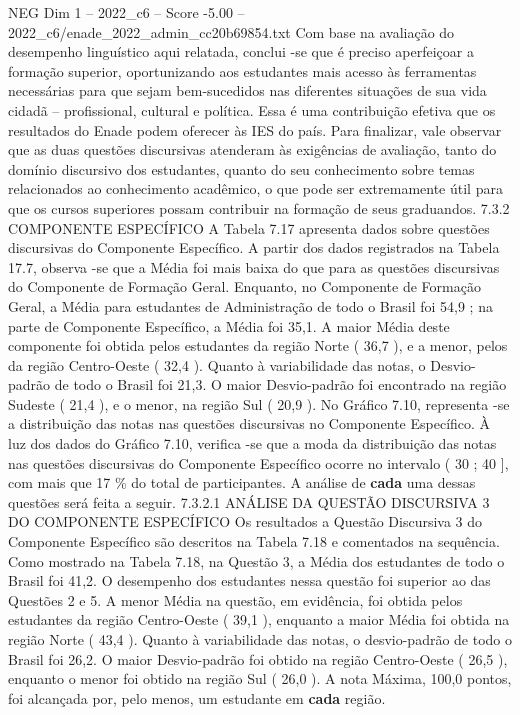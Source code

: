 \begin{textsample}{NEG Dim 1 – 2022\_c6 – Score -5.00 – 2022\_c6/enade\_2022\_admin\_cc20b69854.txt}
Com base na avaliação do desempenho linguístico aqui relatada, conclui -se que é preciso aperfeiçoar a formação superior, oportunizando aos estudantes mais acesso às ferramentas necessárias para que sejam bem-sucedidos nas diferentes situações de sua vida cidadã – profissional, cultural e política.
Essa é uma contribuição efetiva que os resultados do Enade podem oferecer às IES do país.
Para finalizar, vale observar que as duas questões discursivas atenderam às exigências de avaliação, tanto do domínio discursivo dos estudantes, quanto do seu conhecimento sobre temas relacionados ao conhecimento acadêmico, o que pode ser extremamente útil para que os cursos superiores possam contribuir na formação de seus graduandos. 7.3.2 COMPONENTE ESPECÍFICO A Tabela 7.17 apresenta dados sobre questões discursivas do Componente Específico.
A partir dos dados registrados na Tabela 17.7, observa -se que a Média foi mais baixa do que para as questões discursivas do Componente de Formação Geral.
Enquanto, no Componente de Formação Geral, a Média para estudantes de Administração de todo o Brasil foi 54,9 ; na parte de Componente Específico, a Média foi 35,1.
A maior Média deste componente foi obtida pelos estudantes da região Norte ( 36,7 ), e a menor, pelos da região Centro-Oeste ( 32,4 ).
Quanto à variabilidade das notas, o Desvio-padrão de todo o Brasil foi 21,3.
O maior Desvio-padrão foi encontrado na região Sudeste ( 21,4 ), e o menor, na região Sul ( 20,9 ).
No Gráfico 7.10, representa -se a distribuição das notas nas questões discursivas no Componente Específico.
À luz dos dados do Gráfico 7.10, verifica -se que a moda da distribuição das notas nas questões discursivas do Componente Específico ocorre no intervalo ( 30 ; 40 ], com mais que 17 \% do total de participantes.
A análise de \textbf{cada} uma dessas questões será feita a seguir. 7.3.2.1 ANÁLISE DA QUESTÃO DISCURSIVA 3 DO COMPONENTE ESPECÍFICO Os resultados a Questão Discursiva 3 do Componente Específico são descritos na Tabela 7.18 e comentados na sequência.
Como mostrado na Tabela 7.18, na Questão 3, a Média dos estudantes de todo o Brasil foi 41,2.
O desempenho dos estudantes nessa questão foi superior ao das Questões 2 e 5.
A menor Média na questão, em evidência, foi obtida pelos estudantes da região Centro-Oeste ( 39,1 ), enquanto a maior Média foi obtida na região Norte ( 43,4 ).
Quanto à variabilidade das notas, o desvio-padrão de todo o Brasil foi 26,2.
O maior Desvio-padrão foi obtido na região Centro-Oeste ( 26,5 ), enquanto o menor foi obtido na região Sul ( 26,0 ).
A nota Máxima, 100,0 pontos, foi alcançada por, pelo menos, um estudante em \textbf{cada} região.

\end{textsample}

